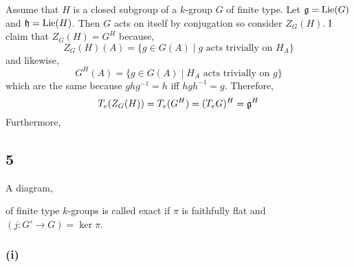 \documentclass[12pt]{article}
\begin{document}
Assume that $H$ is a closed subgroup of a $k$-group $G$ of finite type. Let $\mathfrak{g} = \mathrm{Lie}(G)$ and $\mathfrak{h} = \mathrm{Lie}(H)$. Then $G$ acts on itself by conjugation so consider $Z_G(H)$. I claim that $Z_G(H) = G^H$ because,
\[ Z_G(H)(A) = \{ g \in G(A) \mid g \text{ acts trivially on } H_A \} \]
and likewise,
\[ G^H(A) = \{ g \in G(A) \mid H_A \text{ acts trivially on } g \} \]
which are the same because $ghg^{-1} = h$ iff $hgh^{-1} = g$. Therefore,
\[ T_e(Z_G(H)) = T_e(G^H) = (T_e G)^H = \mathfrak{g}^H \]
Furthermore, 

\subsection{5}

A diagram,
\begin{center}
\end{center}
of finite type $k$-groups is called exact if $\pi$ is faithfully flat and $(j : G' \to G) = \ker{\pi}$. 

\subsubsection{(i)}
\end{document}
